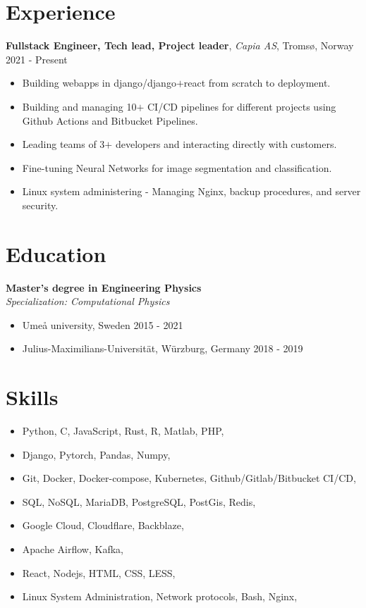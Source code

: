 \documentclass[11pt, a4paper]{article}
\begin{document}
\section*{Experience}
\textbf{Fullstack Engineer, Tech lead, Project leader}, \textit{Capia AS}, Tromsø, Norway \hfill 2021 - Present
\begin{itemize}[noitemsep]
    \item Building webapps in django/django$+$react from scratch to deployment.
    \item Building and managing 10$+$ CI/CD pipelines for different projects using Github Actions and Bitbucket Pipelines.
    \item Leading teams of 3$+$ developers and interacting directly with customers.
    \item Fine-tuning Neural Networks for image segmentation and classification.
    \item Linux system administering - Managing Nginx, backup procedures, and server security.
\end{itemize}

\section*{Education}
\textbf{Master's degree in Engineering Physics}\\
\textit{Specialization: Computational Physics}

\begin{itemize}[noitemsep]
    \item Umeå university, Sweden \hfill 2015 - 2021
    \item Julius-Maximilians-Universität, Würzburg, Germany \hfill 2018 - 2019
\end{itemize}

\section*{Skills}
\begin{itemize}[noitemsep]
    \item Python, C, JavaScript, Rust, R, Matlab, PHP, 
    \item Django, Pytorch, Pandas, Numpy,
    \item Git, Docker, Docker-compose, Kubernetes, Github/Gitlab/Bitbucket CI/CD,
    \item SQL, NoSQL, MariaDB, PostgreSQL, PostGis, Redis,
    \item Google Cloud, Cloudflare, Backblaze,
    \item Apache Airflow, Kafka,
    \item React, Nodejs, HTML, CSS, LESS, 
    \item Linux System Administration, Network protocols, Bash, Nginx,
\end{itemize}
\end{document}
